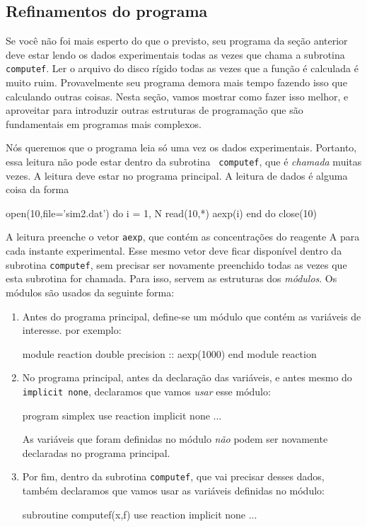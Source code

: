 \documentclass[10pt,a4paper,ssfamily]{exam}
\begin{document}
\subsection{Refinamentos do programa}

Se você não foi mais esperto do que o previsto, seu programa da seção
anterior deve estar lendo os dados experimentais todas as vezes que
chama a subrotina {\tt computef}. Ler o arquivo do disco rígido todas as
vezes que a função é calculada é muito ruim. Provavelmente seu programa
demora mais tempo fazendo isso que calculando outras coisas. Nesta
seção, vamos mostrar como fazer isso melhor, e aproveitar para
introduzir outras estruturas de programação que são fundamentais em
programas mais complexos.    

Nós queremos que o programa leia só uma vez os dados experimentais.
Portanto, essa leitura não pode estar dentro da subrotina {\tt
computef}, que é {\it chamada} muitas vezes. A leitura deve estar no
programa principal. A leitura de dados é alguma coisa da forma 
\begin{code}
open(10,file='sim2.dat')
do i = 1, N
  read(10,*) aexp(i)
end do
close(10)
\end{code}
A leitura preenche o vetor {\tt aexp}, que contém as concentrações do
reagente A para cada instante experimental. Esse mesmo vetor deve ficar
disponível dentro da subrotina {\tt computef}, sem precisar ser
novamente preenchido todas as vezes que esta subrotina for chamada. Para
isso, servem as estruturas dos {\it módulos}. Os módulos são usados da
seguinte forma:
\begin{enumerate}
\item
Antes do programa principal, define-se um módulo que contém as variáveis
de interesse. por exemplo:
\begin{code}
module reaction
  double precision :: aexp(1000)
end module reaction
\end{code}
\item
No programa principal, antes da declaração das variáveis, e antes mesmo
do {\tt implicit none}, declaramos que vamos {\it usar} esse módulo:
\begin{code}
program simplex
  use reaction
  implicit none
  ...
\end{code}
As variáveis que foram definidas no módulo {\it não} podem ser novamente
declaradas no programa principal. 
\item
Por fim, dentro da subrotina {\tt computef}, que vai precisar desses
dados, também declaramos que vamos usar as variáveis definidas no
módulo:
\begin{code}
subroutine computef(x,f)
  use reaction
  implicit none
  ...
\end{code} 
\end{enumerate}
\end{document}
